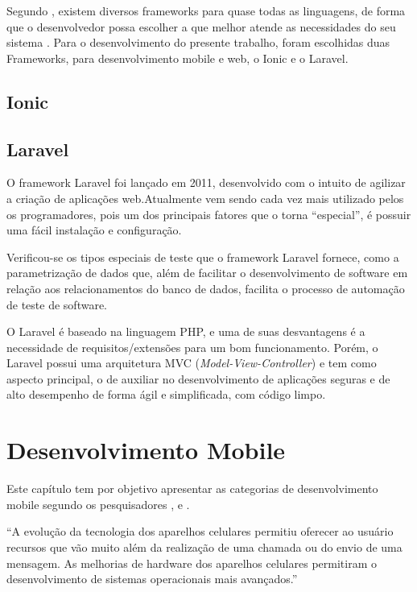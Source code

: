 Segundo , existem diversos frameworks para quase todas as linguagens, de forma que o desenvolvedor possa escolher a que melhor atende as necessidades do seu sistema . Para o desenvolvimento do presente trabalho, foram escolhidas duas Frameworks, para desenvolvimento mobile e web, o Ionic e o Laravel.

\subsection{Ionic}



\subsection{Laravel}

O framework Laravel foi lançado em 2011, desenvolvido com o intuito de agilizar a criação de aplicações web.Atualmente vem sendo cada vez mais utilizado pelos os programadores, pois um dos principais fatores que o torna “especial”, é possuir uma fácil instalação e configuração. 

\begin{citacao}
	Verificou-se os tipos especiais de teste que o framework Laravel fornece, como a parametrização de dados que, além de facilitar o desenvolvimento de software em relação aos relacionamentos do banco de dados, facilita o processo de automação de teste de software.\cite{pelizza2018estudo}
\end{citacao}


O Laravel é baseado na linguagem PHP, e uma de suas desvantagens é a necessidade de requisitos/extensões para um bom funcionamento. Porém, o Laravel possui uma arquitetura MVC (\textit{Model-View-Controller}) e tem como aspecto principal, o de auxiliar no desenvolvimento de aplicações seguras e de alto desempenho de forma ágil e simplificada, com código limpo.\cite{pelizza2018estudo}



\section{Desenvolvimento Mobile}

Este capítulo tem por objetivo apresentar as categorias de desenvolvimento mobile segundo os pesquisadores ,  e .

\begin{citacao}
	“A evolução da tecnologia dos aparelhos celulares permitiu oferecer ao usuário recursos que vão muito além da realização de uma chamada ou do envio de uma mensagem. As melhorias de hardware dos aparelhos celulares permitiram o desenvolvimento de sistemas operacionais mais avançados.”\cite[]{da2014paradigmas}
\end{citacao}

